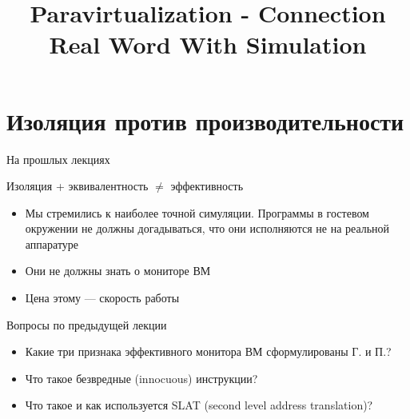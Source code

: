 
\title{Paravirtualization - Connection Real Word With Simulation}



\begin{frame}
    \maketitle
\end{frame}

\begin{frame}
    \tableofcontents
\end{frame}

\section[Изоляция]{Изоляция против производительности}

\begin{frame}{На прошлых лекциях}

Изоляция + эквивалентность $\neq$ эффективность

\begin{itemize}
\item Мы стремились к наиболее точной симуляции. Программы в гостевом окружении не должны догадываться, что они исполняются не на реальной аппаратуре
\item Они не должны знать о мониторе ВМ
\item Цена этому — скорость работы

\end{itemize}

\end{frame}

\begin{frame}{Вопросы по предыдущей лекции}

\begin{itemize}
\item Какие три признака эффективного монитора ВМ сформулированы Г. и П.?
\item Что такое безвредные (innocuous) инструкции?
\item Что такое и как используется SLAT (second level address translation)?


\end{itemize}

\end{frame}


